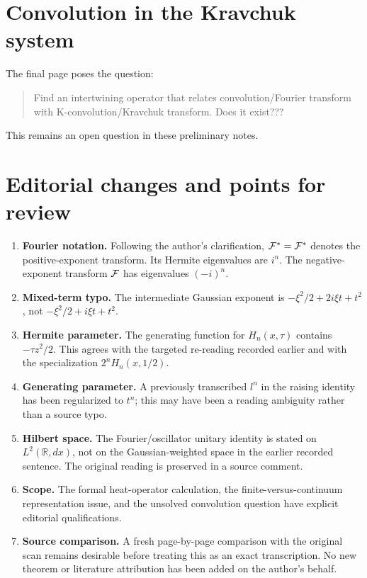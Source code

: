 \documentclass[11pt]{amsart}
\newcommand{\RR}{\mathbb R}
\newcommand{\F}{{\cal F}}
\newcommand{\Fstar}{{\cal F}^{*}}
\begin{document}
\section{Convolution in the Kravchuk system}
The final page poses the question:
\begin{quote}
Find an intertwining operator that relates convolution/Fourier
transform with K-convolution/Kravchuk transform. Does it exist???
\end{quote}
This remains an open question in these preliminary notes.

\appendix
\section{Editorial changes and points for review}
\begin{enumerate}
\item \textbf{Fourier notation.} Following the author's clarification,
$\Fstar={\cal F}^{*}$ denotes the positive-exponent transform.
Its Hermite eigenvalues are $i^n$. The negative-exponent transform
$\F$ has eigenvalues $(-i)^n$.
\item \textbf{Mixed-term typo.} The intermediate Gaussian exponent
is $-\xi^2/2+2i\xi t+t^2$, not
$-\xi^2/2+i\xi t+t^2$.
\item \textbf{Hermite parameter.} The generating function for
$H_n(x,\tau)$ contains $-\tau z^2/2$. This agrees with the targeted
re-reading recorded earlier and with the specialization
$2^nH_n(x,1/2)$.
\item \textbf{Generating parameter.} A previously transcribed $l^n$
in the raising identity has been regularized to $t^n$; this may have
been a reading ambiguity rather than a source typo.
\item \textbf{Hilbert space.} The Fourier/oscillator unitary identity
is stated on $L^2(\RR,dx)$, not on the Gaussian-weighted space in
the earlier recorded sentence. The original reading is preserved
in a source comment.
\item \textbf{Scope.} The formal heat-operator calculation, the
finite-versus-continuum representation issue, and the unsolved
convolution question have explicit editorial qualifications.
\item \textbf{Source comparison.} A fresh page-by-page comparison
with the original scan remains desirable before treating this as
an exact transcription. No new theorem or literature attribution
has been added on the author's behalf.
\end{enumerate}
\end{document}

